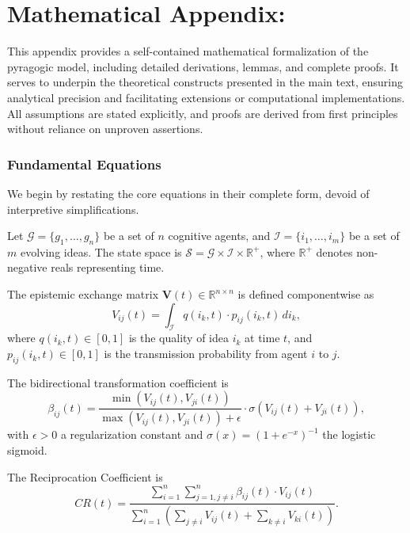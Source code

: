 \chapter{Mathematical Appendix:}
\label{app:math-formalization}

This appendix provides a self-contained mathematical formalization of the pyragogic model, including detailed derivations, lemmas, and complete proofs. It serves to underpin the theoretical constructs presented in the main text, ensuring analytical precision and facilitating extensions or computational implementations. All assumptions are stated explicitly, and proofs are derived from first principles without reliance on unproven assertions.

\subsection{Fundamental Equations}

We begin by restating the core equations in their complete form, devoid of interpretive simplifications.

Let \(\mathcal{G} = \{g_1, \dots, g_n\}\) be a set of \(n\) cognitive agents, and \(\mathcal{I} = \{i_1, \dots, i_m\}\) be a set of \(m\) evolving ideas. The state space is \(\mathcal{S} = \mathcal{G} \times \mathcal{I} \times \mathbb{R}^+\), where \(\mathbb{R}^+\) denotes non-negative reals representing time.

The epistemic exchange matrix \(\mathbf{V}(t) \in \mathbb{R}^{n \times n}\) is defined componentwise as
\begin{equation}
	V_{ij}(t) = \int_{\mathcal{I}} q(i_k, t) \cdot p_{ij}(i_k, t) \, di_k,
	\label{eq:epistemic-value-full}
\end{equation}
where \(q(i_k, t) \in [0,1]\) is the quality of idea \(i_k\) at time \(t\), and \(p_{ij}(i_k, t) \in [0,1]\) is the transmission probability from agent \(i\) to \(j\).

The bidirectional transformation coefficient is
\begin{equation}
	\beta_{ij}(t) = \frac{\min(V_{ij}(t), V_{ji}(t))}{\max(V_{ij}(t), V_{ji}(t)) + \epsilon} \cdot \sigma(V_{ij}(t) + V_{ji}(t)),
	\label{eq:beta-coefficient-full}
\end{equation}
with \(\epsilon > 0\) a regularization constant and \(\sigma(x) = (1 + e^{-x})^{-1}\) the logistic sigmoid.

The Reciprocation Coefficient is
\begin{equation}
	CR(t) = \frac{\sum_{i=1}^n \sum_{j=1, j \neq i}^n \beta_{ij}(t) \cdot V_{ij}(t)}
	{\sum_{i=1}^n \left(\sum_{j \neq i} V_{ij}(t) + \sum_{k \neq i} V_{ki}(t)\right)}.
	\label{eq:cr-formal-full}
\end{equation}

